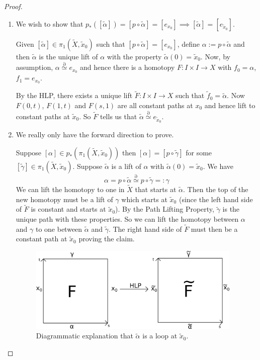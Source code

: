 \documentclass[11pt]{article}
\newcommand{\defeq}{:=}
\newcommand{\eqdef}{=:}
\newcommand{\homrel}{\stackrel{\partial}{\simeq}}
\begin{document}
\begin{proof}
\begin{enumerate}
	\item We wish to show that $p_\ast([\widetilde{\alpha}])=[p\circ \widetilde{\alpha}]=[e_{x_0}]\implies [\widetilde{\alpha}]=[e_{\widetilde{x}_0}]$.

	Given $[\widetilde{\alpha}]\in\pi_1(\widetilde{X}, \widetilde{x}_0)$ such that $[p\circ\widetilde{\alpha}]=[e_{x_0}]$, define $\alpha\defeq p\circ\widetilde{\alpha}$ and then $\widetilde{\alpha}$ is the unique lift of $\alpha$ with the property $\widetilde{\alpha}(0)=\widetilde{x}_0$. 
	Now, by assumption, $\alpha\homrel e_{x_0}$ and hence there is a homotopy $F:I\times I \to X$ with $f_0=\alpha$, $f_1=e_{x_0}$.

	By the HLP, there exists a unique lift $\widetilde{F}:I\times I \to X$ such that $\widetilde{f}_0=\widetilde{\alpha}$.
	Now $F(0, t)$, $F(1, t)$ and $F(s, 1)$ are all constant paths at $x_0$ and hence lift to constant paths at $\widetilde{x}_0$.
	So $\widetilde{F}$ tells us that $\widetilde{\alpha}\homrel e_{\widetilde{x}_0}$.

	\item We really only have the forward direction to prove.

		Suppose $[\alpha]\in p_\ast(\pi_1(\widetilde{X}, \widetilde{x}_0))$ then $[\alpha]=[p\circ \widetilde{\gamma}]$ for some $[\widetilde{\gamma}]\in\pi_1(\widetilde{X}, \widetilde{x}_0)$.
		Suppose $\widetilde{\alpha}$ is a lift of $\alpha$ with $\widetilde{\alpha}(0)=\widetilde{x}_0$.
		We have
		\[
			\alpha = p\circ \widetilde{\alpha}\homrel p\circ\widetilde{\gamma}\eqdef\gamma
		\]
		We can lift the homotopy to one in $\widetilde{X}$ that starts at $\widetilde{\alpha}$.
		Then the top of the new homotopy must be a lift of $\gamma$ which starts at $\widetilde{x}_0$ (since the left hand side of $\widetilde{F}$ is constant and starts at $\widetilde{x}_0$).
		By the Path Lifting Property, $\widetilde{\gamma}$ is the unique path with these properties.
		So we can lift the homotopy between $\alpha$ and $\gamma$ to one between $\widetilde{\alpha}$ and $\widetilde{\gamma}$.
		The right hand side of $\widetilde{F}$ must then be a constant path at $\widetilde{x}_0$ proving the claim.
		
		\begin{figure}[ht]
			\centering
			\includegraphics[width=4in]{HLPdiagram_1.png}
			\caption{Diagrammatic explanation that $\widetilde{\alpha}$ is a loop at $\widetilde{x}_0$.}
		\end{figure}
\end{enumerate}
\end{proof}
\end{document}
